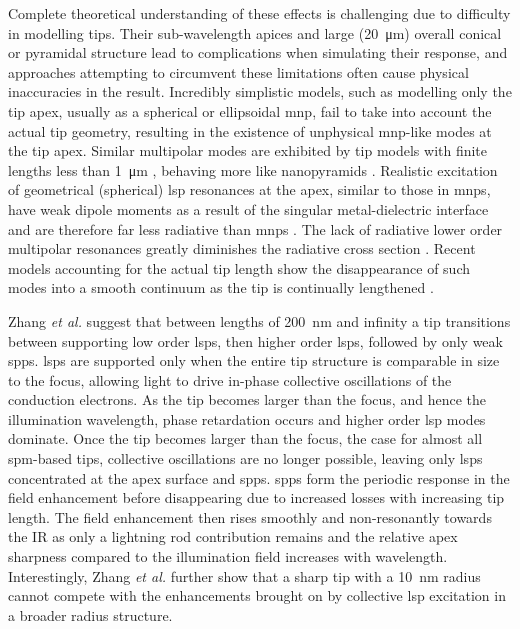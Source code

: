 \documentclass{article}
\begin{document}
Complete theoretical understanding of these effects is challenging due to difficulty in modelling tips. Their sub-wavelength apices and large (\SI{20}{\micro\metre}) overall conical or pyramidal structure lead to complications when simulating their response, and approaches attempting to circumvent these limitations often cause physical inaccuracies in the result.
Incredibly simplistic models, such as modelling only the tip apex, usually as a spherical or ellipsoidal \gls{mnp}, fail to take into account the actual tip geometry, resulting in the existence of unphysical \gls{mnp}-like modes at the tip apex. Similar multipolar modes are exhibited by tip models with finite lengths less than \SI{1}{\micro\metre} \cite{roth2006, goncharenko2006}, behaving more like nanopyramids \cite{schafer2013, cherukulappurath2013}. Realistic excitation of geometrical (spherical) \gls{lsp} resonances at the apex, similar to those in \glspl{mnp}, have weak dipole moments as a result of the singular metal-dielectric interface and are therefore far less radiative than \glspl{mnp} \cite{downes2006}. {\color{red}The lack of radiative lower order multipolar resonances greatly diminishes the radiative cross section \cite{renger2004}.} Recent models accounting for the actual tip length show the disappearance of such modes into a smooth continuum as the tip is continually lengthened \cite{zhang2009}.

Zhang \emph{et al.} \cite{zhang2009} suggest that between lengths of \SI{200}{nm} and infinity a tip transitions between supporting low order \glspl{lsp}, then higher order \glspl{lsp}, followed by only weak \glspl{spp}. \Glspl{lsp} are supported only when the entire tip structure is comparable in size to the focus, allowing light to drive in-phase collective oscillations of the conduction electrons. As the tip becomes larger than the focus, and hence the illumination wavelength, phase retardation occurs and higher order \gls{lsp} modes dominate. Once the tip becomes larger than the focus, the case for almost all \gls{spm}-based tips, collective oscillations are no longer possible, leaving only \glspl{lsp} concentrated at the apex surface and \glspl{spp}. \Glspl{spp} form the periodic response in the field enhancement before disappearing due to increased losses with increasing tip length. The field enhancement then rises smoothly and non-resonantly towards the IR as only a lightning rod contribution remains and the relative apex sharpness compared to the illumination field increases with wavelength. Interestingly, Zhang \emph{et al.} further show that a sharp tip with a \SI{10}{nm} radius cannot compete with the enhancements brought on by collective \gls{lsp} excitation in a broader radius structure. %
\end{document}
